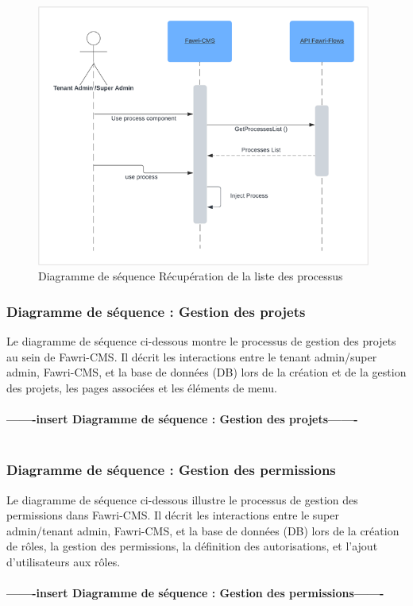 \begin{figure}[H]
  \centering
  \includegraphics[width=11cm]{Figures/Diagramme_sequence _Recuperation_list_proc.png}
  \caption{Diagramme de séquence  Récupération de la liste des processus}
\end{figure}


\subsubsection{Diagramme de séquence : Gestion des projets}
\hspace{\parindent}Le diagramme de séquence ci-dessous montre le processus de gestion des projets au sein de Fawri-CMS. Il décrit les interactions entre le tenant admin/super admin, Fawri-CMS, et la base de données (DB) lors de la création et de la gestion des projets, les pages associées et les éléments de menu.
\\
\\
\textbf{-------insert Diagramme de séquence : Gestion des projets-------}
\\
\\




\subsubsection{Diagramme de séquence : Gestion des permissions}
\hspace{\parindent}Le diagramme de séquence ci-dessous illustre le processus de gestion des permissions dans Fawri-CMS. Il décrit les interactions entre le super admin/tenant admin, Fawri-CMS, et la base de données (DB) lors de la création de rôles, la gestion des permissions, la définition des autorisations, et l'ajout d'utilisateurs aux rôles.
\\
\\
\textbf{-------insert Diagramme de séquence : Gestion des permissions-------}
\\
\\



